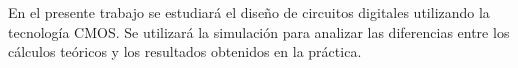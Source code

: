En el presente trabajo se estudiará el diseño de circuitos digitales utilizando la tecnología CMOS.
Se utilizará la simulación para analizar las diferencias entre los cálculos teóricos y los resultados
obtenidos en la práctica.